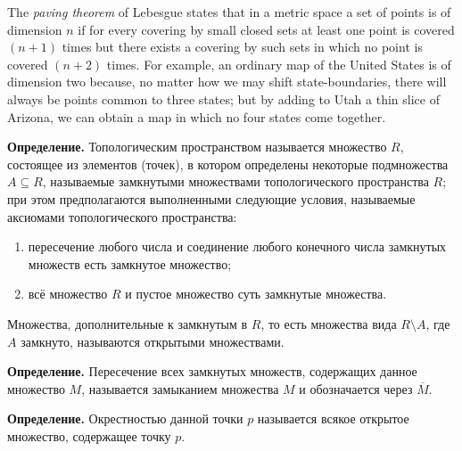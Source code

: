 
\begin{sourcebox}
The \emph{paving theorem} of Lebesgue states that in a metric space a set of points is of dimension $n$ if for every covering by small closed sets at least one point is covered $(n+1)$ times but there exists a covering by such sets in which no point is covered $(n+2)$ times. For example, an ordinary map of the United States is of dimension two because, no matter how we may shift state-boundaries, there will always be points common to three states; but by adding to Utah a thin slice of Arizona, we can obtain a map in which no four states come together.
\end{sourcebox}

\begin{rusblock}
\textbf{Определение.} Топологическим пространством называется множество $R$, состоящее из элементов (точек), в котором определены некоторые подмножества $A\subseteq R$, называемые замкнутыми множествами топологического пространства $R$; при этом предполагаются выполненными следующие условия, называемые аксиомами топологического пространства:
\begin{enumerate}[leftmargin=2.2em]
\item пересечение любого числа и соединение любого конечного числа замкнутых множеств есть замкнутое множество;
\item всё множество $R$ и пустое множество суть замкнутые множества.
\end{enumerate}
Множества, дополнительные к замкнутым в $R$, то есть множества вида $R\setminus A$, где $A$ замкнуто, называются открытыми множествами.

\textbf{Определение.} Пересечение всех замкнутых множеств, содержащих данное множество $M$, называется замыканием множества $M$ и обозначается через $\overline M$.

\textbf{Определение.} Окрестностью данной точки $p$ называется всякое открытое множество, содержащее точку $p$.
\end{rusblock}

